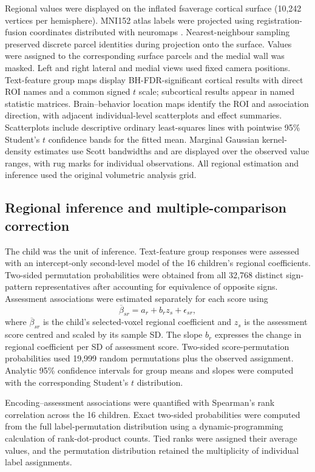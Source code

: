 Regional values were displayed on the inflated fsaverage cortical surface (10,242 vertices per hemisphere). MNI152 atlas labels were projected using registration-fusion coordinates distributed with neuromaps \cite{neuromaps}. Nearest-neighbour sampling preserved discrete parcel identities during projection onto the surface. Values were assigned to the corresponding surface parcels and the medial wall was masked. Left and right lateral and medial views used fixed camera positions. Text-feature group maps display BH-FDR-significant cortical results with direct ROI names and a common signed $t$ scale; subcortical results appear in named statistic matrices. Brain--behavior location maps identify the ROI and association direction, with adjacent individual-level scatterplots and effect summaries. Scatterplots include descriptive ordinary least-squares lines with pointwise 95\% Student's $t$ confidence bands for the fitted mean. Marginal Gaussian kernel-density estimates use Scott bandwidths and are displayed over the observed value ranges, with rug marks for individual observations. All regional estimation and inference used the original volumetric analysis grid.

\subsection{Regional inference and multiple-comparison correction}
The child was the unit of inference. Text-feature group responses were assessed with an intercept-only second-level model of the 16 children's regional coefficients. Two-sided permutation probabilities were obtained from all 32,768 distinct sign-pattern representatives after accounting for equivalence of opposite signs. Assessment associations were estimated separately for each score using
\begin{equation}
 \overline{\beta}_{sr}=a_r+b_r z_s+\epsilon_{sr},
\end{equation}
where $\overline{\beta}_{sr}$ is the child's selected-voxel regional coefficient and $z_s$ is the assessment score centred and scaled by its sample SD. The slope $b_r$ expresses the change in regional coefficient per SD of assessment score. Two-sided score-permutation probabilities used 19,999 random permutations plus the observed assignment. Analytic 95\% confidence intervals for group means and slopes were computed with the corresponding Student's $t$ distribution.

Encoding--assessment associations were quantified with Spearman's rank correlation across the 16 children. Exact two-sided probabilities were computed from the full label-permutation distribution using a dynamic-programming calculation of rank-dot-product counts. Tied ranks were assigned their average values, and the permutation distribution retained the multiplicity of individual label assignments.

